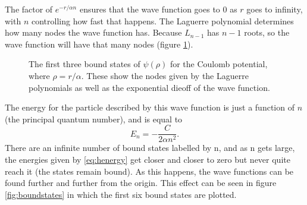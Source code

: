 \documentclass[12pt,twoside]{reedthesis}
\newcommand{\eqn}[1]{\begin{equation}#1\end{equation}}
\begin{document}
The factor of $e^{-r /\alpha n}$ ensures that the wave function goes to 0 as $r$ goes to infinity, with $n$ controlling how fast that happens. The Laguerre polynomial determines how many nodes the wave function has. Because $L_{n-1}$ has $n-1$ roots, so the wave function will have that many nodes (figure \ref{fig:wavefunctions}).
\begin{figure}[h]
\centering
{}
\caption[The first three bound states of $\psi(\rho)$ for the Coulomb potential]{The first three bound states of $\psi(\rho)$ for the Coulomb potential, where $\rho = r/\alpha$. These show the nodes given by the Laguerre polynomials as well as the exponential dieoff of the wave function.}
\label{fig:wavefunctions}
\end{figure}

The energy for the particle described by this wave function is just a function of $n$ (the principal quantum number), and is equal to
\eqn{
E_n = -\frac{C}{2\alpha n^2}\mbox{.}
\label{eq:henergy}
}
There are an infinite number of bound states labelled by n, and as n gets large, the energies given by \eqref{eq:henergy} get closer and closer to zero but never quite reach it (the states remain bound). As this happens, the wave functions can be found further and further from the origin. This effect can be seen in figure \ref{fig:boundstates} in which the first six bound states are plotted.
\end{document}
